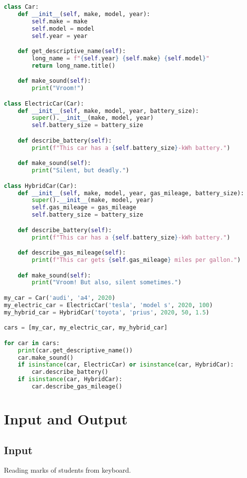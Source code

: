 \documentclass[11pt]{article}
\begin{document}
\begin{lstlisting}[language=Python]
class Car:
    def __init__(self, make, model, year):
        self.make = make
        self.model = model
        self.year = year

    def get_descriptive_name(self):
        long_name = f"{self.year} {self.make} {self.model}"
        return long_name.title()

    def make_sound(self):
        print("Vroom!")

class ElectricCar(Car):
    def __init__(self, make, model, year, battery_size):
        super().__init__(make, model, year)
        self.battery_size = battery_size

    def describe_battery(self):
        print(f"This car has a {self.battery_size}-kWh battery.")

    def make_sound(self):
        print("Silent, but deadly.")

class HybridCar(Car):
    def __init__(self, make, model, year, gas_mileage, battery_size):
        super().__init__(make, model, year)
        self.gas_mileage = gas_mileage
        self.battery_size = battery_size

    def describe_battery(self):
        print(f"This car has a {self.battery_size}-kWh battery.")

    def describe_gas_mileage(self):
        print(f"This car gets {self.gas_mileage} miles per gallon.")

    def make_sound(self):
        print("Vroom! But also, silent sometimes.")

my_car = Car('audi', 'a4', 2020)
my_electric_car = ElectricCar('tesla', 'model s', 2020, 100)
my_hybrid_car = HybridCar('toyota', 'prius', 2020, 50, 1.5)

cars = [my_car, my_electric_car, my_hybrid_car]

for car in cars:
    print(car.get_descriptive_name())
    car.make_sound()
    if isinstance(car, ElectricCar) or isinstance(car, HybridCar):
        car.describe_battery()
    if isinstance(car, HybridCar):
        car.describe_gas_mileage()

\end{lstlisting}

\section{Input and Output}
\subsection{Input}
Reading marks of students from keyboard.
\end{document}
